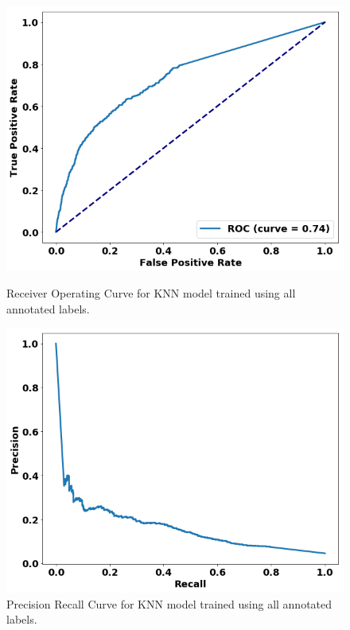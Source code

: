 \begin{figure}
\centering
\begin{minipage}[b]{.4\textwidth}
\includegraphics[trim=0in 0.1in 0.1in 0.in,clip,width=1.0\textwidth]{figures/roc_all_gensim.png}
\caption{Receiver Operating Curve for KNN model trained using all annotated labels.}\label{fig:all_rocs}
\end{minipage}\qquad
\begin{minipage}[b]{.4\textwidth}
\includegraphics[trim=0in 0.1in 0.1in 0.in,clip,width=1.0\textwidth]{figures/prc_all_gensim.png}
\caption{Precision Recall Curve for KNN model trained using all annotated labels.}\label{fig:all_prcs}

\end{minipage}
\end{figure}
